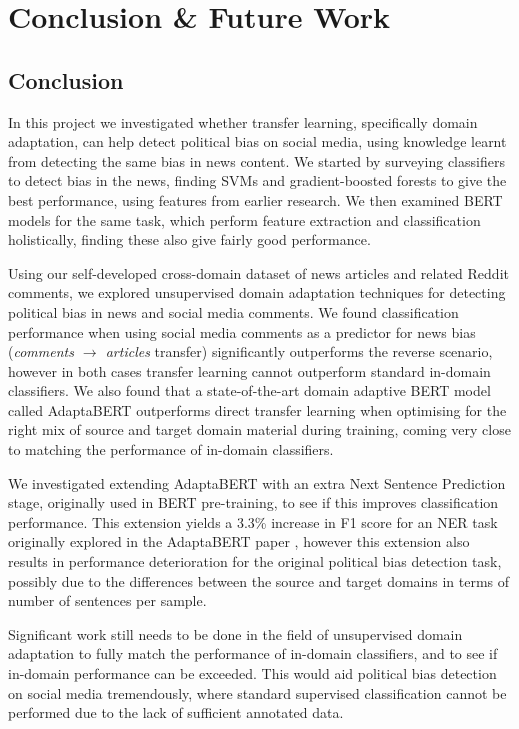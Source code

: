\chapter{Conclusion \& Future Work}

\section{Conclusion}

In this project we investigated whether transfer learning, specifically domain adaptation, can help detect political bias on social media, using knowledge learnt from detecting the same bias in news content. We started by surveying classifiers to detect bias in the news, finding SVMs and gradient-boosted forests to give the best performance, using features from earlier research. We then examined BERT models for the same task, which perform feature extraction and classification holistically, finding these also give fairly good performance.

Using our self-developed cross-domain dataset of news articles and related Reddit comments, we explored unsupervised domain adaptation techniques for detecting political bias in news and social media comments. We found classification performance when using social media comments as a predictor for news bias (\textit{comments $ \rightarrow $ articles} transfer) significantly outperforms the reverse scenario, however in both cases transfer learning cannot outperform standard in-domain classifiers. We also found that a state-of-the-art domain adaptive BERT model called AdaptaBERT outperforms direct transfer learning when optimising for the right mix of source and target domain material during training, coming very close to matching the performance of in-domain classifiers.

We investigated extending AdaptaBERT with an extra Next Sentence Prediction stage, originally used in BERT pre-training, to see if this improves classification performance. This extension yields a 3.3\% increase in F1 score for an NER task originally explored in the AdaptaBERT paper \cite{adaptabert}, however this extension also results in performance deterioration for the original political bias detection task, possibly due to the differences between the source and target domains in terms of number of sentences per sample.

Significant work still needs to be done in the field of unsupervised domain adaptation to fully match the performance of in-domain classifiers, and to see if in-domain performance can be exceeded. This would aid political bias detection on social media tremendously, where standard supervised classification cannot be performed due to the lack of sufficient annotated data.

